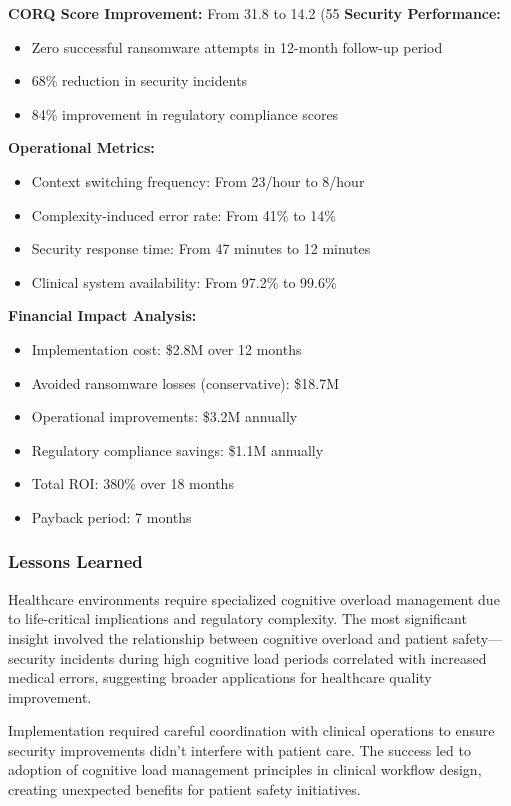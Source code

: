 \documentclass[11pt,a4paper]{article}
\begin{document}
\textbf{CORQ Score Improvement:} From 31.8 to 14.2 (55%
\textbf{Security Performance:}
\begin{itemize}
\item Zero successful ransomware attempts in 12-month follow-up period
\item 68\% reduction in security incidents
\item 84\% improvement in regulatory compliance scores
\end{itemize}

\textbf{Operational Metrics:}
\begin{itemize}
\item Context switching frequency: From 23/hour to 8/hour
\item Complexity-induced error rate: From 41\% to 14\%
\item Security response time: From 47 minutes to 12 minutes
\item Clinical system availability: From 97.2\% to 99.6\%
\end{itemize}

\textbf{Financial Impact Analysis:}
\begin{itemize}
\item Implementation cost: \$2.8M over 12 months
\item Avoided ransomware losses (conservative): \$18.7M
\item Operational improvements: \$3.2M annually
\item Regulatory compliance savings: \$1.1M annually
\item Total ROI: 380\% over 18 months
\item Payback period: 7 months
\end{itemize}

\subsubsection{Lessons Learned}

Healthcare environments require specialized cognitive overload management due to life-critical implications and regulatory complexity. The most significant insight involved the relationship between cognitive overload and patient safety---security incidents during high cognitive load periods correlated with increased medical errors, suggesting broader applications for healthcare quality improvement.

Implementation required careful coordination with clinical operations to ensure security improvements didn't interfere with patient care. The success led to adoption of cognitive load management principles in clinical workflow design, creating unexpected benefits for patient safety initiatives.
\end{document}

